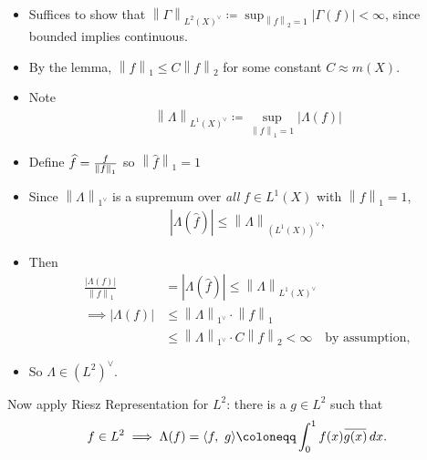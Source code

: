\begin{solution}
\begin{itemize}
\item
  Suffices to show that
  \({\left\lVert {\Gamma} \right\rVert}_{L^2(X)^\vee} \coloneqq\sup_{{\left\lVert {f} \right\rVert}_2 = 1} {\left\lvert {\Gamma(f)} \right\rvert} < \infty\),
  since bounded implies continuous.
\item
  By the lemma,
  \({\left\lVert {f} \right\rVert}_1 \leq C{\left\lVert {f} \right\rVert}_2\)
  for some constant \(C \approx m(X)\).
\item
  Note
  \begin{align*}{\left\lVert {\Lambda} \right\rVert}_{L^1(X)^\vee} \coloneqq\displaystyle\sup_{{\left\lVert {f} \right\rVert}_1 = 1} {\left\lvert {\Lambda(f)} \right\rvert}\end{align*}
\item
  Define \(\widehat{f} = {f\over {\left\lVert {f} \right\rVert}_1}\) so
  \({\left\lVert {\widehat{f}} \right\rVert}_1 = 1\)
\item
  Since \({\left\lVert {\Lambda} \right\rVert}_{1^\vee}\) is a supremum
  over \emph{all} \(f \in L^1(X)\) with
  \({\left\lVert {f} \right\rVert}_1 =1\),
  \begin{align*}
  {\left\lvert {\Lambda(\widehat{f})} \right\rvert} \leq {\left\lVert {\Lambda} \right\rVert}_{(L^1(X))^\vee}
  ,\end{align*}
\item
  Then
  \begin{align*}
  \frac{{\left\lvert {\Lambda(f)} \right\rvert}}{{\left\lVert {f} \right\rVert}_1} &= {\left\lvert {\Lambda(\widehat{f})} \right\rvert} \leq {\left\lVert {\Lambda} \right\rVert}_{L^1(X)^\vee} \\
  \implies {\left\lvert {\Lambda(f)} \right\rvert} 
  &\leq {\left\lVert {\Lambda} \right\rVert}_{1^\vee} \cdot {\left\lVert {f} \right\rVert}_1 \\
  &\leq {\left\lVert {\Lambda} \right\rVert}_{1^\vee} \cdot C {\left\lVert {f} \right\rVert}_2 < \infty \quad\text{by assumption}
  ,\end{align*}
\item
  So \(\Lambda \in (L^2)^\vee\).
\end{itemize}

Now apply Riesz Representation for \(L^2\): there is a \(g \in L^2\)
such that
\begin{align*}f\in L^2 \implies \Lambda(f) = {\left\langle {f},~{g} \right\rangle} \coloneqq\int_0^1 f(x) \mkern 1.5mu\overline{\mkern-1.5mug(x)\mkern-1.5mu}\mkern 1.5mu\, dx.\end{align*}


\end{solution}
